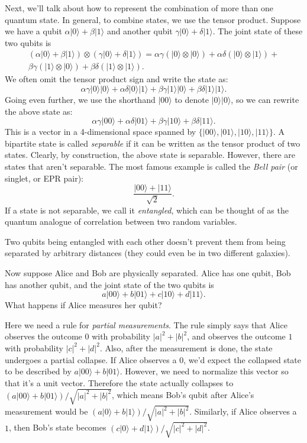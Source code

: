 \documentclass[12pt]{report}
\theoremstyle{plain}
\theoremstyle{definition}
\renewcommand{\ket}[1]{|#1\rangle}
\newcommand{\tensor}{\otimes}
\begin{document}
Next, we'll talk about how to represent the combination of more than one quantum state. In general, to combine states, we use the tensor product. Suppose we have a qubit $\alpha \ket{0} + \beta \ket{1}$ and another qubit $\gamma \ket{0} + \delta \ket{1}$. The joint state of these two qubits is
\begin{multline*}
(\alpha \ket{0} + \beta \ket{1}) \tensor (\gamma \ket{0} + \delta \ket{1}) = \alpha \gamma (\ket{0} \tensor \ket{0}) + \alpha \delta (\ket{0} \tensor \ket{1}) + \\ 
\beta \gamma (\ket{1} \tensor \ket{0}) + \beta \delta (\ket{1} \tensor \ket{1}).
\end{multline*}
We often omit the tensor product sign and write the state as:
\[
\alpha \gamma \ket{0}  \ket{0} + \alpha \delta \ket{0}  \ket{1} + \beta \gamma \ket{1}  \ket{0} + \beta \delta \ket{1}  \ket{1}.
\]
Going even further, we use the shorthand $\ket{00}$ to denote $\ket{0}\ket{0}$, so we can rewrite the above state as:
\[
\alpha \gamma \ket{00} + \alpha \delta \ket{01} + \beta \gamma \ket{10} + \beta \delta \ket{11}.
\]
This is a vector in a 4-dimensional space spanned by $\{\ket{00}, \ket{01}, \ket{10}, \ket{11}\}$. A bipartite state is called \emph{separable} if it can be written as the tensor product of two states. Clearly, by construction, the above state is separable. However, there are states that aren't separable. The most famous example is called the {\em Bell pair} (or singlet, or EPR pair):
\[
\frac{\ket{00} + \ket{11}}{\sqrt{2}}.
\]
If a state is not separable, we call it \emph{entangled}, which can be thought of as the quantum analogue of correlation between two random variables.

Two qubits being entangled with each other doesn't prevent them from being separated by arbitrary distances (they could even be in two different galaxies).

Now suppose Alice and Bob are physically separated. Alice has one qubit, Bob has another qubit, and the joint state of the two qubits is
\[
a \ket{00} + b \ket{01} + c \ket{10} + d \ket{11}.
\]
What happens if Alice measures her qubit?

Here we need a rule for \emph{partial measurements}. The rule simply says that Alice observes the outcome $0$ with probability $|a|^2 + |b|^2$, and observes the outcome $1$ with probability $|c|^2 + |d|^2$. Also, after the measurement is done, the state undergoes a partial collapse. If Alice observes a $0$, we'd expect the collapsed state to be described by $a \ket{00} + b \ket{01}$. However, we need to normalize this vector so that it's a unit vector. Therefore the state actually collapses to $(a \ket{00} + b \ket{01})/\sqrt{|a|^2 + |b|^2}$, which means Bob's qubit after Alice's measurement would be $(a \ket{0} + b \ket{1})/\sqrt{|a|^2 + |b|^2}$. Similarly, if Alice observes a $1$, then Bob's state becomes $(c \ket{0} + d \ket{1})/\sqrt{|c|^2 + |d|^2}$.
\end{document}

